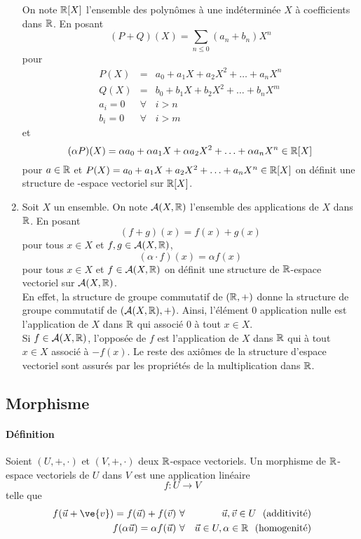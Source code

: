 \begin{enumerate}
    On note $\mathbb{R}[X]$ l'ensemble des polynômes à une indéterminée $X$ à coefficients dans $\mathbb{R}$. En posant $$(P + Q)(X) = \sum_{n \leq 0} (a_n + b_n)X^n$$ pour 
    \begin{eqnarray*}
      P(X) &=& a_0 + a_1 X + a_2 X^2 + \ldots + a_n X^{n} \\
      Q(X) &=& b_0 + b_1 X + b_2 X^2 + \ldots + b_n X^{m} \\
      a_i = 0 &\forall& i > n \\
      b_i = 0 &\forall& i > m
    \end{eqnarray*}
    et 
    $$(\alpha P)(X) = \alpha a_0 + \alpha a_1 X + \alpha a_2 X^2 + \ldots + \alpha a_n X^{n} \in \mathbb{R}[X]$$
    pour $a \in \mathbb{R}$ et $P(X) = a_0 + a_1 X + a_2 X^2 + \ldots + a_n X^{n} \in \mathbb{R}[X]$ on définit une structure de \R-espace vectoriel sur $\mathbb{R}[X]$.
  \item Soit $X$ un ensemble. On note $\mathcal{A}(X, \mathbb{R})$ l'ensemble des applications de $X$ dans $\mathbb{R}$. En posant
    $$(f + g)(x) = f(x) + g(x)$$
    pour tous $x \in X$ et $f, g \in \mathcal{A}(X, \mathbb{R})$,
    $$(\alpha \cdot f)(x) = \alpha f(x)$$
    pour tous $x \in X$ et $f \in \mathcal{A}(X, \mathbb{R})$ on définit une structure de $\mathbb{R}$-espace vectoriel sur $\mathcal{A}(X, \mathbb{R})$. \\
    
    En effet, la structure de groupe commutatif de $(\mathbb{R}, +)$ donne la structure de groupe commutatif de $(\mathcal{A}(X, \mathbb{R}), +)$. Ainsi, l'élément $0$ application nulle est l'application de $X$ dans $\mathbb{R}$ qui associé $0$ à tout $x \in X$. \\
    Si $f \in \mathcal{A}(X, \mathbb{R})$, l'opposée de $f$ est l'application de $X$ dans $\mathbb{R}$ qui à tout $x \in X$ associé à $-f(x)$. Le reste des axiômes de la structure d'espace vectoriel sont assurés par les propriétés de la multiplication dans $\mathbb{R}$.
\end{enumerate}

%
\subsection{Morphisme}
%
\paragraph{Définition} Soient $(U, +, \cdot)$ et $(V, +, \cdot)$ deux $\mathbb{R}$-espace vectoriels. Un morphisme de $\mathbb{R}$-espace vectoriels de $U$ dans $V$ est une application linéaire
  $$f: U \rightarrow V$$
  telle que
  \begin{eqnarray*}
    f(\vec{u} + \ve{v}) = f(\vec{u}) + f(\vec{v}) ~ &\forall&\vec{u}, \vec{v} \in U \mbox{~ (additivité)}\\
    f(\alpha \vec{u} ) = \alpha f(\vec{u}) ~ &\forall&\vec{u} \in U, \alpha \in \R \mbox{~ (homogenité)}
  \end{eqnarray*}

